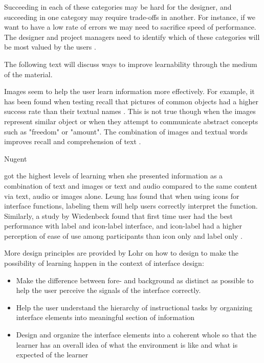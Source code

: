Succeeding in each of these categories may be hard for the designer, and succeeding in one category may require trade-offs in another. For instance, if we want to have a low rate of errors we may need to sacrifice speed of performance. The designer and project managers need to identify which of these categories will be most valued by the users \cite{Shneiderman2004}.


The following text will discuss ways to improve learnability through the medium of the material.

Images seem to help the user learn information more effectively. For example, it has been found when testing recall that pictures of common objects had a higher success rate than their textual names \cite{Lieberman1965} \cite{Nelson1976} \cite{Paivio1969} \cite{Paivio1973}. This is not true though when the images represent similar object \cite{Nelson1976} or when they attempt to communicate abstract concepts such as "freedom" or "amount". The combination of images and textual words improves recall \cite{Paivio1973} and comprehension of text \cite{Levie1982}.

Nugent  got the highest levels of learning when she presented information as a combination of text and images or text and audio compared to the same content via text, audio or images alone. Leung \cite{Leung2009} has found that when using icons for interface functions, labeling them will help users correctly interpret the function. Similarly, a study by Wiedenbeck found that first time user had the best performance with label and icon-label interface, and icon-label had a higher perception of ease of use among participants than icon only and label only \cite{Wiedenbeck1999}.

More design principles are provided by Lohr \cite{Lohr2000} on how to design to make the possibility of learning happen in the context of interface design:

\begin{itemize}
  \item Make the difference between fore- and background as distinct as possible to help the user perceive the signals of the interface correctly.
  \item Help the user understand the hierarchy of instructional tasks by organizing interface elements into meaningful section of information
  \item Design and organize the interface elements into a coherent whole so that the learner has an overall idea of what the environment is like and what is expected of the learner
\end{itemize}

